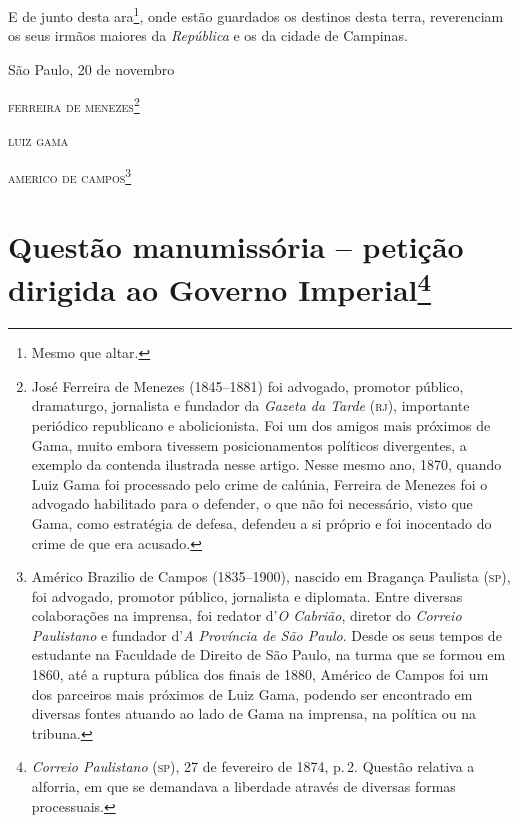 E de junto desta ara\footnote{ Mesmo que altar.}, onde estão guardados
os destinos desta terra, reverenciam os seus irmãos maiores da
\emph{República} e os da cidade de Campinas.

\begin{flushright}
São Paulo, 20 de novembro

\textsc{ferreira de menezes}\footnote{ José Ferreira de Menezes (1845--1881) foi
  advogado, promotor público, dramaturgo, jornalista e fundador da
  \emph{Gazeta da Tarde} (\textsc{rj}), importante periódico republicano e
  abolicionista. Foi um dos amigos mais próximos de Gama, muito embora
  tivessem posicionamentos políticos divergentes, a exemplo da contenda
  ilustrada nesse artigo. Nesse mesmo ano, 1870, quando Luiz Gama foi
  processado pelo crime de calúnia, Ferreira de Menezes foi o advogado
  habilitado para o defender, o que não foi necessário, visto que Gama,
  como estratégia de defesa, defendeu a si próprio e foi inocentado do
  crime de que era acusado.}

\textsc{luiz gama}

\textsc{americo de campos}\footnote{ Américo Brazilio de Campos (1835--1900),
  nascido em Bragança Paulista (\textsc{sp}), foi advogado, promotor público,
  jornalista e diplomata. Entre diversas colaborações na imprensa, foi
  redator d'\emph{O Cabrião}, diretor do \emph{Correio Paulistano} e
  fundador d'\emph{A Província de São Paulo}. Desde os seus tempos de
  estudante na Faculdade de Direito de São Paulo, na turma que se formou
  em 1860, até a ruptura pública dos finais de 1880, Américo de Campos
  foi um dos parceiros mais próximos de Luiz Gama, podendo ser
  encontrado em diversas fontes atuando ao lado de Gama na imprensa, na
  política ou na tribuna.}
\end{flushright}

\chapter{Questão manumissória -- petição dirigida ao Governo
Imperial\footnote{\emph{Correio Paulistano} (\textsc{sp}), 27 de fevereiro de 1874, p.\,2.
  Questão relativa a alforria, em que se demandava a liberdade através
  de diversas formas processuais.}} %

